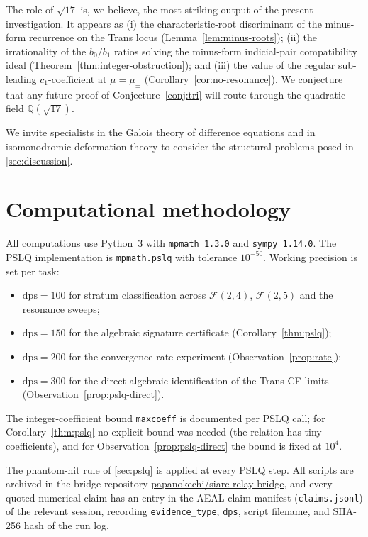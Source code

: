\documentclass[11pt]{amsart}
\theoremstyle{definition}
\theoremstyle{remark}
\newcommand{\FF}{\mathcal{F}}
\newcommand{\dps}{\mathrm{dps}}
\newcommand{\Q}{\mathbb{Q}}
\begin{document}
The role of $\sqrt{17}$ is, we believe, the most striking output of
the present investigation.  It appears as (i) the characteristic-root
discriminant of the minus-form recurrence on the Trans locus
(Lemma~\ref{lem:minus-roots}); (ii) the irrationality of the
$b_0/b_1$ ratios solving the minus-form indicial-pair compatibility
ideal (Theorem~\ref{thm:integer-obstruction}); and (iii) the value
of the regular sub-leading $c_1$-coefficient at $\mu = \mu_\pm$
(Corollary~\ref{cor:no-resonance}).  We conjecture that any future
proof of Conjecture~\ref{conj:tri} will route through the quadratic
field $\Q(\sqrt{17})$.

We invite specialists in the Galois theory of difference equations
and in isomonodromic deformation theory to consider the structural
problems posed in \textsection\ref{sec:discussion}.

\appendix
\section{Computational methodology}\label{app:methods}

All computations use Python~3 with \texttt{mpmath~1.3.0} and
\texttt{sympy~1.14.0}.  The PSLQ implementation is
\texttt{mpmath.pslq} with tolerance $10^{-50}$.  Working precision is
set per task:
\begin{itemize}[leftmargin=1.4em]
\item $\dps = 100$ for stratum classification across $\FF(2,4)$,
$\FF(2,5)$ and the resonance sweeps;
\item $\dps = 150$ for the algebraic signature certificate
(Corollary~\ref{thm:pslq});
\item $\dps = 200$ for the convergence-rate experiment
(Observation~\ref{prop:rate});
\item $\dps = 300$ for the direct algebraic identification of the
Trans CF limits (Observation~\ref{prop:pslq-direct}).
\end{itemize}
The integer-coefficient bound \texttt{maxcoeff} is documented per
PSLQ call; for Corollary~\ref{thm:pslq} no explicit bound was needed
(the relation has tiny coefficients), and for
Observation~\ref{prop:pslq-direct} the bound is fixed at $10^{4}$.

The phantom-hit rule of \textsection\ref{sec:pslq} is applied at
every PSLQ step.  All scripts are archived in the bridge repository
\href{https://github.com/papanokechi/siarc-relay-bridge}%
{papanokechi/siarc-relay-bridge}, and every quoted numerical claim
has an entry in the AEAL claim manifest (\texttt{claims.jsonl}) of
the relevant session, recording \texttt{evidence\_type}, \texttt{dps},
script filename, and SHA-256 hash of the run log.
\end{document}

